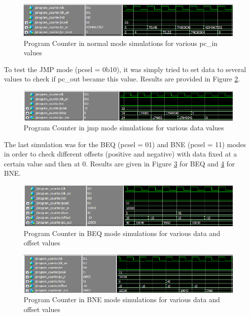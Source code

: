 \begin{figure}[H]
    \centering
    \includegraphics[width=\linewidth]{Chapter3-CPU/res/pc_simu_00.PNG}
    \caption{Program Counter in normal mode simulations for various pc\_in values}
    \label{fig:sim/pc_00}
\end{figure}

To test the JMP mode (pcsel = 0b10), it was simply tried to set data to several values to check if 
pc\_out became this value. Results are provided in Figure \ref{fig:sim/pc_10}.

\begin{figure}[H]
    \centering
    \includegraphics[width=\linewidth]{Chapter3-CPU/res/pc_simu_10.PNG}
    \caption{Program Counter in jmp mode simulations for various data values}
    \label{fig:sim/pc_10}
\end{figure}

The last simulation was for the BEQ (pcsel = 01) and BNE (pcsel = 11) modes in order to check 
different offsets (positive and negative) with data fixed at a certain value and then at 0.
Results are given in Figure \ref{fig:sim/pc_01} for BEQ and \ref{fig:sim/pc_11} for BNE.

\begin{figure}[H]
    \centering
    \includegraphics[width=\linewidth]{Chapter3-CPU/res/pc_simu_01.PNG}
    \caption{Program Counter in BEQ mode simulations for various data and offset values}
    \label{fig:sim/pc_01}
\end{figure}

\begin{figure}[H]
    \centering
    \includegraphics[width=\linewidth]{Chapter3-CPU/res/pc_simu_11.PNG}
    \caption{Program Counter in BNE mode simulations for various data and offset values}
    \label{fig:sim/pc_11}
\end{figure}

